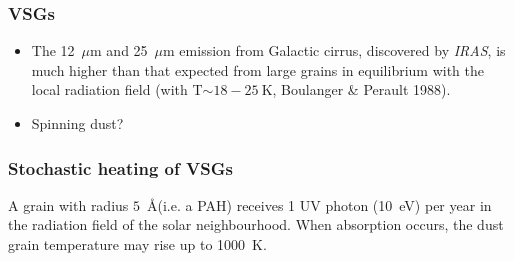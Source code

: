 \begin{frame}\frametitle{VSGs}

\begin{itemize}
\item The  12~$\mu$m and 25~$\mu$m emission from Galactic cirrus, 
discovered by {\em IRAS}, is much higher than that expected from large
grains in equilibrium with the local radiation field (with T$\sim
18-25~$K, Boulanger \& Perault 1988).

\item Spinning dust?

\end{itemize}

\end{frame}
\begin{frame}\frametitle{Stochastic heating of VSGs}


\begin{center}
\end{center}

A grain with radius $5$~\AA (i.e. a PAH) receives 1 UV photon (10~eV)
per year in the radiation field of the solar neighbourhood. When
absorption occurs, the dust grain temperature may rise up to 1000~K.
  


\end{frame}
